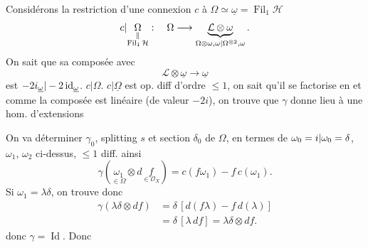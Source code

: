 Considérons la restriction d'une connexion $c$ à $\Omega\simeq\underline{\omega}=\operatorname{Fil}_1\mathcal{H}$
\[
c|\underset{\substack{\Vert\\\operatorname{Fil}_1\mathcal{H}}}{\Omega}:\quad
\Omega\longrightarrow\underbrace{\mathcal{L}\otimes\omega}_{{\Omega\otimes\omega,\omega|\Omega^{\otimes2},\omega}}.
\]
On sait que sa composée avec
\[
\mathcal{L}\otimes\underline{\omega}\longrightarrow\underline{\omega}
\]
est ${-2i_{\underline{\omega}}|-2\operatorname{id}_{\underline{\omega}}}$.   $c|\Omega$.
$c|\underline{\Omega}$ est op. diff d'ordre $\leq1$, on sait qu'il se factorise en
et comme la composée
est linéaire (de valeur $-2i$), on trouve que $\gamma$ donne lieu à une hom. d'extensions

On va déterminer $\gamma_0$,  splitting $s$ et section $\delta_0$ de $\Omega$, en termes de ${\omega_0=i|\omega_0=\delta}$, $\omega_1$, $\omega_2$ ci-dessus,    $\leq1$ diff.
ainsi
\[
\gamma(\underset{\in\Omega}{\omega_1}\otimes d\underset{\in\mathcal{O}_X}{f})=c(f\omega_1)-f\,c(\omega_1).
\]
Si $\omega_1=\lambda\delta$, on trouve donc
\[
\begin{aligned}
\gamma(\lambda\delta\otimes df)&=\delta\,[d(f\lambda)-f\,d(\lambda)]\\
&=\delta\,[\lambda\,df]=\lambda\delta\otimes df.
\end{aligned}
\]
donc $\gamma=\operatorname{Id}$. Donc

